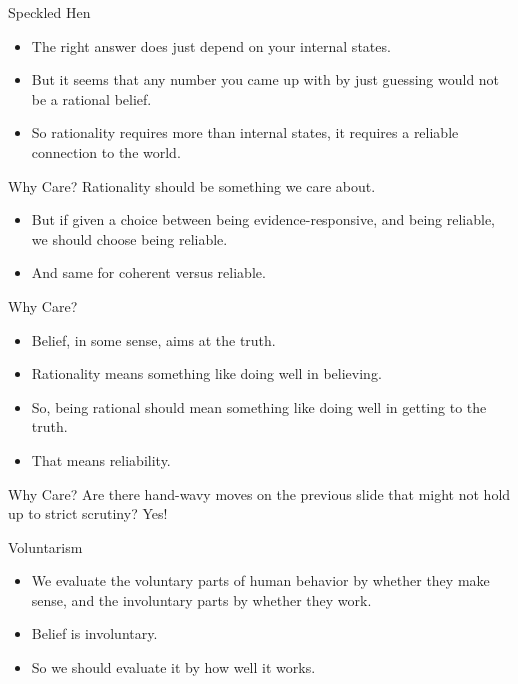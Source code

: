 \documentclass[
  17pt,
  letterpaper,
  ignorenonframetext,
  aspectratio=169,
  handout]{beamer}
\providecommand{\tightlist}{%
  \setlength{\itemsep}{0pt}\setlength{\parskip}{0pt}}\usepackage{longtable,booktabs,array}
\begin{document}
\begin{frame}{Speckled Hen}
\protect\hypertarget{speckled-hen-1}{}
\begin{itemize}[<+->]
\tightlist
\item
  The right answer does just depend on your internal states.
\item
  But it seems that any number you came up with by just guessing would
  not be a rational belief.
\item
  So rationality requires more than internal states, it requires a
  reliable connection to the world.
\end{itemize}
\end{frame}

\begin{frame}{Why Care?}
\protect\hypertarget{why-care}{}
Rationality should be something we care about.

\begin{itemize}[<+->]
\tightlist
\item
  But if given a choice between being evidence-responsive, and being
  reliable, we should choose being reliable.
\item
  And same for coherent versus reliable.
\end{itemize}
\end{frame}

\begin{frame}{Why Care?}
\protect\hypertarget{why-care-1}{}
\begin{itemize}[<+->]
\tightlist
\item
  Belief, in some sense, aims at the truth.
\item
  Rationality means something like doing well in believing.
\item
  So, being rational should mean something like doing well in getting to
  the truth.
\item
  That means reliability.
\end{itemize}
\end{frame}

\begin{frame}{Why Care?}
\protect\hypertarget{why-care-2}{}
Are there hand-wavy moves on the previous slide that might not hold up
to strict scrutiny? Yes!
\end{frame}

\begin{frame}{Voluntarism}
\protect\hypertarget{voluntarism}{}
\begin{itemize}[<+->]
\tightlist
\item
  We evaluate the voluntary parts of human behavior by whether they make
  sense, and the involuntary parts by whether they work.
\item
  Belief is involuntary.
\item
  So we should evaluate it by how well it works.
\end{itemize}
\end{frame}
\end{document}
